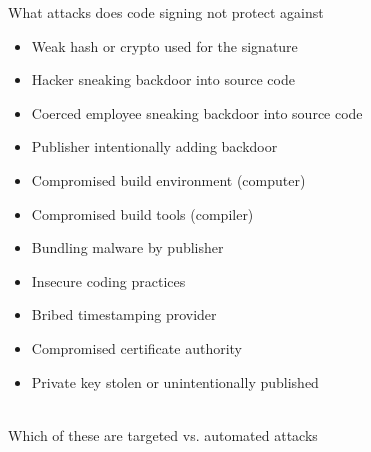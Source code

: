 \documentclass[11pt]{beamer}
\begin{document}
\begin{frame}{What attacks does code signing not protect against}
\begin{itemize}
\item Weak hash or crypto used for the signature
\item Hacker sneaking backdoor into source code
\item Coerced employee sneaking backdoor into source code
\item Publisher intentionally adding backdoor
\item Compromised build environment (computer)
\item Compromised build tools (compiler)
\item Bundling malware by publisher
\item Insecure coding practices
\item Bribed timestamping provider
\item Compromised certificate authority
\item Private key stolen or unintentionally published
\end{itemize}
\\[0.2cm]
Which of these are targeted vs. automated attacks
\end{frame}
\end{document}
